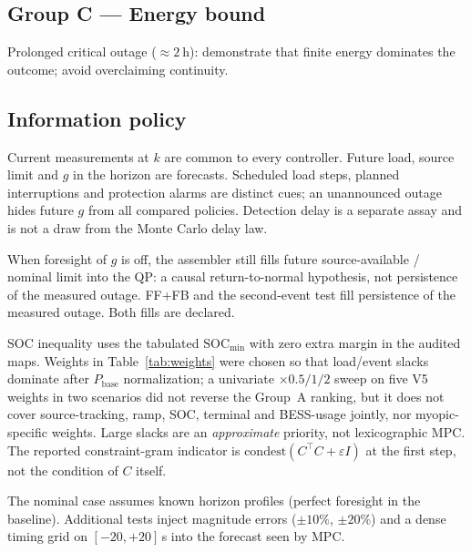 \documentclass{ieeeaccess}
\begin{document}
\subsection{Group C --- Energy bound}
Prolonged critical outage ($\approx\SI{2}{\hour}$): demonstrate that finite energy dominates the outcome; avoid overclaiming continuity.

\subsection{Information policy}
\label{sec:infopol}
Current measurements at $k$ are common to every controller. Future load, source limit and $g$ in the horizon are forecasts. Scheduled load steps, planned interruptions and protection alarms are distinct cues; an unannounced outage hides future $g$ from all compared policies. Detection delay is a separate assay and is not a draw from the Monte Carlo delay law.

When foresight of $g$ is off, the assembler still fills future source-available / nominal limit into the QP: a causal return-to-normal hypothesis, not persistence of the measured outage. FF+FB and the second-event test fill persistence of the measured outage. Both fills are declared.

SOC inequality uses the tabulated $\mathrm{SOC}_{\min}$ with zero extra margin in the audited maps. Weights in Table~\ref{tab:weights} were chosen so that load/event slacks dominate after $P_{\mathrm{base}}$ normalization; a univariate $\times 0.5/1/2$ sweep on five V5 weights in two scenarios did not reverse the Group~A ranking, but it does not cover source-tracking, ramp, SOC, terminal and BESS-usage jointly, nor myopic-specific weights. Large slacks are an \emph{approximate} priority, not lexicographic MPC. The reported constraint-gram indicator is $\mathrm{condest}(C^\top C+\varepsilon I)$ at the first step, not the condition of $C$ itself.

The nominal case assumes known horizon profiles (perfect foresight in the baseline). Additional tests inject magnitude errors ($\pm 10\%$, $\pm 20\%$) and a dense timing grid on $[-20,+20]$\,s into the forecast seen by MPC.
\end{document}
